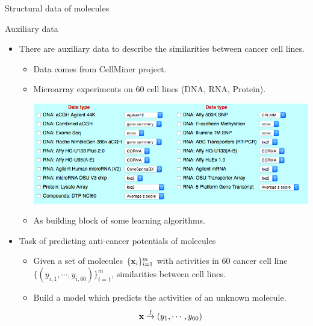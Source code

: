 \documentclass[first=dgreen,second=purple,logo=yellowexc]{aaltoslides}
\begin{document}
{\begin{frame}{Structural data of molecules}
\begin{itemize}
	\end{itemize}
\end{frame}

\begin{frame}{Auxiliary data}
	\begin{itemize}
		\item There are auxiliary data to describe the similarities between cancer cell lines.
		\begin{itemize}
			\footnotesize
			\item Data comes from CellMiner project.
			\item Microarray experiments on $60$ cell lines (DNA, RNA, Protein).
			\begin{center}
				\includegraphics[scale=0.3]{./figures/auxiliarydata.png}
			\end{center}
			\item As building block of some learning algorithms. 
		\end{itemize}
		\item Task of predicting anti-cancer potentials of molecules
		\begin{itemize}
			\footnotesize
			\item Given a set of molecules $\{\mathbf {x}_i\}_{i=1}^m$ with activities in $60$ cancer cell line $\{(y_{i,1},\cdots,y_{i,60})\}_{i=1}^m$, similarities between cell lines.
			\item Build a model which predicts the activities of an unknown molecule.
			\begin{align*}
				\mathbf {x} \overset{f}{\rightarrow} (y_{1},\cdots,y_{60})
			\end{align*}
		\end{itemize}
	\end{itemize}
\end{frame}


}
\end{document}

